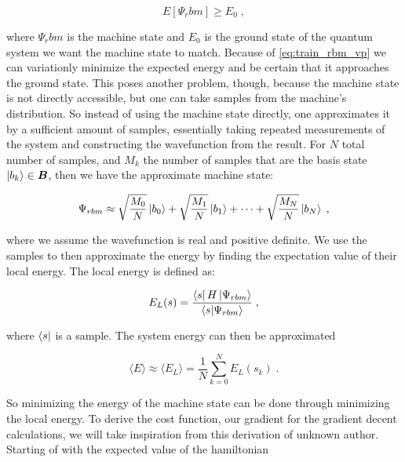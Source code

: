 \begin{equation}
  E \left [ \Psi_rbm \right ] \geq E_0 \; ,
  \label{eq:train_rbm_vp}
\end{equation}

where $\Psi_rbm$ is the machine state and $E_0$ is the ground state of the quantum system we want the machine state to match. Because of \ref{eq:train_rbm_vp} we can variationly minimize the expected energy and be certain that it approaches the ground state. This poses another problem, though, because the machine state is not directly accessible, but one can take samples from the machine's distribution. So instead of using the machine state directly, one approximates it by a sufficient amount of samples, essentially taking repeated measurements of the system and constructing the wavefunction from the result. For $N$ total number of samples, and $M_k$ the number of samples that are the basis state $\ket{b_k} \in \boldsymbol{B}$, then we have the approximate machine state:

\begin{equation}
  \Psi_{rbm} \approx \sqrt{\frac{M_0}{N}} \ket{b_0} + \sqrt{\frac{M_1}{N}}\ket{b_1} + \dots + \sqrt{\frac{M_N}{N}}\ket{b_N} \; ,
  \label{eq:approximate_machine_state}
\end{equation}

where we assume the wavefunction is real and positive definite. We use the samples to then approximate the energy by finding the expectation value of their local energy. The local energy is defined as:

\begin{equation}
  E_L(s) = \frac{\bra{s}H\ket{\Psi_{rbm}}}{\braket{s}{\Psi_{rbm}}} \; ,
  \label{eq:rbm_local_energy}
\end{equation}

where $\bra{s}$ is a sample. The system energy can then be approximated

\begin{equation}
  \langle E \rangle \approx \langle E_L \rangle = \frac{1}{N} \sum_{k=0}^{N} E_L(s_k) \; .
  \label{eq:rbm_energy}
\end{equation}

So minimizing the energy of the machine state can be done through minimizing the local energy. To derive the cost function, our gradient for the gradient decent calculations, we will take inspiration from this derivation \cite{DerivationGradient} of unknown author. Starting of with the expected value of the hamiltonian

